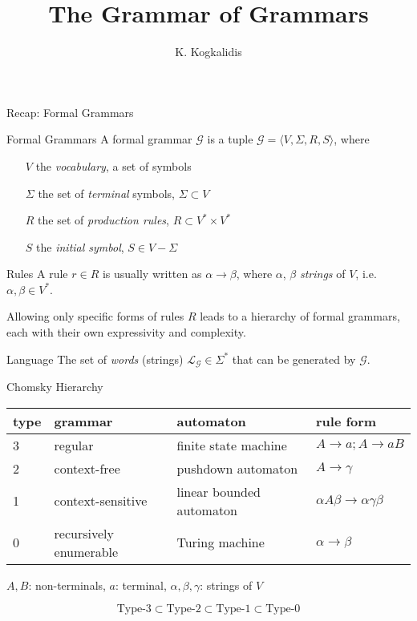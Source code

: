 \documentclass{beamer}
\title{The Grammar of Grammars}
\author{K. Kogkalidis}
\institute{Logic \& Language 2020}
\begin{document}
\date{}
\maketitle

\begin{frame}{Recap: Formal Grammars}
	\small
	\begin{block}{Formal Grammars}
	A formal grammar $\mathcal{G}$ is a tuple $\mathcal{G} = \langle V, \Sigma, R, S \rangle$, where
	\begin{itemize}
		\item[$V$] the \textit{vocabulary}, a set of symbols
		\item [$\Sigma$] the set of \textit{terminal} symbols, $\Sigma \subset V$
		\item [$R$] the set of \textit{production rules}, $R \subset V^*\!\times\! V^*$\\
		\item [$S$] the \textit{initial symbol}, $S \in V - \Sigma$ 
	\end{itemize}
	\end{block}
	
	\begin{block}{Rules}
		A rule $r \in R$ is usually written as $\alpha \to \beta$, where $\alpha$, $\beta$ \textit{strings}	of $V$,
		i.e. $\alpha, \beta \in V^*$.
		
		Allowing only specific forms of rules $R$ leads to a \alert{hierarchy} of formal grammars, each with their own expressivity and complexity.
	\end{block}
	
	\begin{block}{Language}
		The set of \textit{words} (strings) $\mathcal{L}_\mathcal{G} \in \Sigma^*$ that can be generated by $\mathcal{G}$.
	\end{block}
\end{frame}

\begin{frame}{Chomsky Hierarchy}
	\footnotesize
    \begin{tabularx}{0.99\textwidth}{@{}llll@{}}
    type & grammar & automaton & rule form\\
    \toprule
    3 & regular & finite state machine & $A\to a; A\to a B$\\
    2 & context-free & pushdown automaton & $A\to \gamma$\\
    1 & context-sensitive & linear bounded automaton & $\alpha A \beta \to \alpha \gamma \beta$ \\
    0 & recursively enumerable & Turing machine & $\alpha \to \beta$
	\end{tabularx}
	
	\begin{flushright}
		$A,B$: non-terminals, $a$: terminal, $\alpha, \beta, \gamma$: strings of $V$
	\end{flushright}
	
	\alert{
	\[
		\text{Type-}3 \subset \text{Type-}2 \subset \text{Type-}1 \subset \text{Type-}0
	\]
	}
\end{frame}
\end{document}
